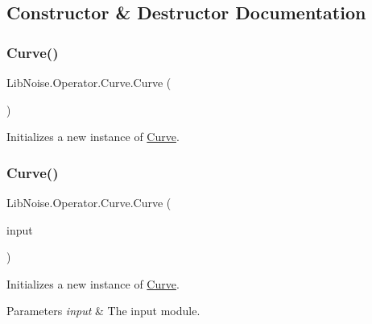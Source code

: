 \subsection{Constructor \& Destructor Documentation}
\mbox{\label{class_lib_noise_1_1_operator_1_1_curve_ae32d42df5a7a3865c2a3aaa15f40a277}} 
\subsubsection{\texorpdfstring{Curve()}{Curve()}\hspace{0.1cm}{\footnotesize\ttfamily [1/2]}}
{\footnotesize\ttfamily Lib\+Noise.\+Operator.\+Curve.\+Curve (\begin{DoxyParamCaption}{ }\end{DoxyParamCaption})}



Initializes a new instance of \hyperlink{class_lib_noise_1_1_operator_1_1_curve}{Curve}. 

\mbox{\label{class_lib_noise_1_1_operator_1_1_curve_a67e6fbd88ca58ea59c2204db591d49bb}} 
\subsubsection{\texorpdfstring{Curve()}{Curve()}\hspace{0.1cm}{\footnotesize\ttfamily [2/2]}}
{\footnotesize\ttfamily Lib\+Noise.\+Operator.\+Curve.\+Curve (\begin{DoxyParamCaption}\item[{\hyperlink{class_lib_noise_1_1_module_base}{Module\+Base}}]{input }\end{DoxyParamCaption})}



Initializes a new instance of \hyperlink{class_lib_noise_1_1_operator_1_1_curve}{Curve}. 


\begin{DoxyParams}{Parameters}
{\em input} & The input module.\\
\hline
\end{DoxyParams}


